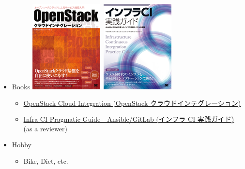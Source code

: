 \documentclass[aspectratio=169,11pt,hyperref={colorlinks=true}]{beamer}
\begin{document}
\begin{frame}
\begin{itemize}
    \item Books \includegraphics[scale=0.1]{OpenStack_Integration_book.png}~\includegraphics[scale=0.1]{InfraCI_book.png}
      \begin{itemize}
      \item \href{https://www.amazon.co.jp/dp/4798139785/}{\scriptsize{OpenStack
        Cloud Integration (OpenStack クラウドインテグレーション)}}
      \item \href{https://www.amazon.co.jp/dp/4798155128/}{\scriptsize{Infra CI
        Pragmatic Guide - Ansible/GitLab (インフラ CI 実践ガイド)}} (as a reviewer)
      \end{itemize}
    \item Hobby
      \begin{itemize}
      \item Bike, Diet, etc.
      \end{itemize}
  \end{itemize}
\end{frame}
\end{document}
